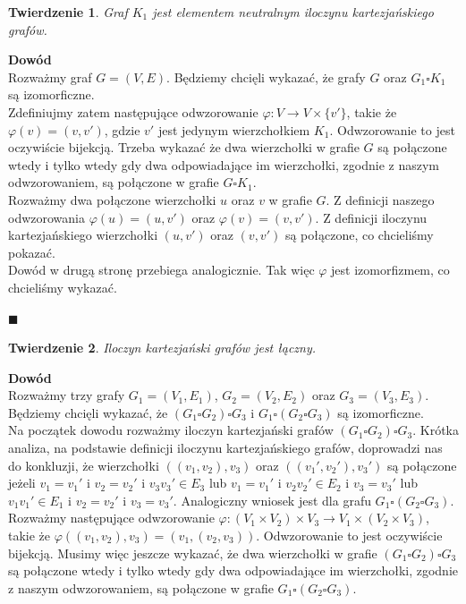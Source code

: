 \documentclass[12pt,a4paper,titlepage]{article}
\newtheorem{twr}{Twierdzenie}
\newcommand\tab[1][1cm]{\hspace*{#1}}
\begin{document}
\begin{twr}
Graf $K_1$ jest elementem neutralnym iloczynu kartezjańskiego grafów.
\end{twr}
\tab[-0.6cm]\textbf{Dowód}\\
\tab[0.6cm]Rozważmy graf $G=(V, E)$. Będziemy chcięli wykazać, że grafy $G$ oraz $G_1 \square K_1$ są izomorficzne. \\
\tab[0.6cm]Zdefiniujmy zatem następujące odwzorowanie $\varphi : V \rightarrow V \times \{v'\}$, takie że $\varphi(v) = (v, v')$, gdzie $v'$ jest jedynym wierzchołkiem $K_1$. Odwzorowanie to jest oczywiście bijekcją. Trzeba wykazać że dwa wierzchołki w grafie $G$ są połączone wtedy i tylko wtedy gdy dwa odpowiadające im wierzchołki, zgodnie z naszym odwzorowaniem, są połączone w grafie $G \square K_1$.\\
\tab[0.6cm]Rozważmy dwa połączone wierzchołki $u$ oraz $v$ w grafie $G$. Z definicji naszego odwzorowania $\varphi (u) = (u, v')$ oraz $\varphi(v) = (v, v')$. Z definicji iloczynu kartezjańskiego wierzchołki $(u, v')$ oraz $(v, v')$ są połączone, co chcieliśmy pokazać.\\
\tab[0.6cm]Dowód w drugą stronę przebiega analogicznie. Tak więc $\varphi$ jest izomorfizmem, co chcieliśmy wykazać. 
\begin{flushright}
$\blacksquare$
\end{flushright}
\begin{twr}
Iloczyn kartezjański grafów jest łączny.
\end{twr}
\textbf{Dowód}\\
\tab[0.6cm]Rozważmy trzy grafy $G_1 = (V_1, E_1)$, $G_2 = (V_2, E_2)$ oraz $G_3 = (V_3, E_3)$. Będziemy chcięli wykazać, że $(G_1 \square G_2 ) \square G_3 $ i $G_1 \square ( G_2 \square G_3) $ są izomorficzne.\\
\tab[0.6cm]Na początek dowodu rozważmy iloczyn kartezjański grafów $(G_1 \square G_2 ) \square G_3 $. Krótka analiza, na podstawie definicji iloczynu kartezjańskiego grafów, doprowadzi nas do konkluzji, że wierzchołki $((v_1, v_2), v_3)$ oraz $((v_1', v_2'), v_3')$ są połączone jeżeli $v_1 = v_1'$ i $v_2=v_2'$ i $v_3 v_3' \in E_3$ lub $v_1 = v_1'$ i $v_2 v_2' \in E_2$ i $v_3 = v_3' $ lub $v_1 v_1' \in E_1$ i $v_2=v_2'$ i $v_3= v_3'$. Analogiczny wniosek jest dla grafu $G_1 \square ( G_2 \square G_3) $.\\ 
\tab[0.6cm]Rozważmy następujące odwzorowanie $\varphi : (V_1 \times V_2 ) \times V_3 \rightarrow V_1 \times (V_2 \times V_3)$, takie że $\varphi ((v_1, v_2), v_3) = (v_1, (v_2, v_3))$. Odwzorowanie to jest oczywiście bijekcją. Musimy więc jeszcze wykazać, że dwa wierzchołki w grafie $(G_1 \square G_2 ) \square G_3 $ są połączone wtedy i tylko wtedy gdy dwa odpowiadające im wierzchołki, zgodnie z naszym odwzorowaniem, są połączone w grafie $G_1 \square ( G_2 \square G_3) $.\\
\end{document}
